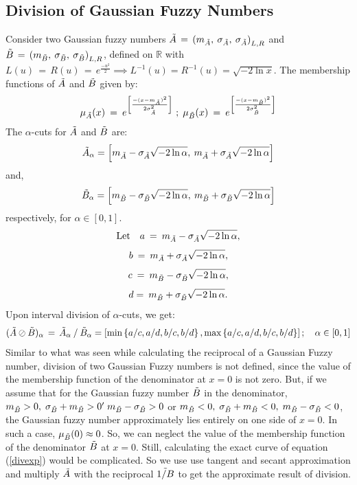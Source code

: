 \documentclass{article}
\begin{document}
\subsection{Division of Gaussian Fuzzy Numbers}
Consider two Gaussian fuzzy numbers $\Tilde{A} \,=\, \left(m_{\Tilde{A}},\: \sigma_{\Tilde{A}}, \:\sigma_{\Tilde{A}}\right)_{L,R}$ and $\Tilde{B}\,=\, \left(m_{\Tilde{B}},\: \sigma_{\Tilde{B}}, \:\sigma_{\Tilde{B}}\right)_{L,R}$, defined on $\mathbb{R}$ with $L(u) \,=\, R(u)\,=\,e^{\frac{-u^2}{2}}\implies L^{-1}(u) = R^{-1} (u) = \sqrt{-2\ln{x}}$. The membership functions of $\Tilde{A}$ and $\Tilde{B}$ given by:
\[ \mu_{\Tilde{A}}(x) \:=\:e^{\left[ \frac{-(x-m_{\Tilde{A}})^2}{2\sigma_{\Tilde{A}}^{2}} \right]}\;  ; \;\mu_{\Tilde{B}}(x) \: = \:e^{\left[ \frac{-(x-m_{\Tilde{B}})^2}{2\sigma_{\Tilde{B}}^{2}} \right]} \]
The $\alpha$-cuts for $\Tilde{A}$ and $\Tilde{B}$ are: \[ \Tilde{A}_{\alpha} = \left[m_{\Tilde{A}}-\sigma_{\Tilde{A}}\sqrt{-2\ln{\alpha}}, \: m_{\Tilde{A}}+\sigma_{\Tilde{A}}\sqrt{-2\ln{\alpha}} \right]\] and, \[ \Tilde{B}_{\alpha} = \left[m_{\Tilde{B}}-\sigma_{\Tilde{B}}\sqrt{-2\ln{\alpha}}, \: m_{\Tilde{B}}+\sigma_{\Tilde{B}}\sqrt{-2\ln{\alpha}} \right]\] respectively, for $\alpha\in[0,1]$.
\[
\text{Let}\quad a\: = \:m_{\Tilde{A}}-\sigma_{\Tilde{A}}\sqrt{-2\ln{\alpha}},\] 
\[b \: =  \: m_{\Tilde{A}}+\sigma_{\Tilde{A}}\sqrt{-2\ln{\alpha}},\]
\[c \: =\: m_{\Tilde{B}}-\sigma_{\Tilde{B}}\sqrt{-2\ln{\alpha}}, \]
\[d = \:  m_{\Tilde{B}}+\sigma_{\Tilde{B}}\sqrt{-2\ln{\alpha}}.
\]\newline Upon interval division of $\alpha$-cuts, we get:
\begin{equation}\label{divexp}
 (\Tilde{A}\oslash\Tilde{B})_\alpha\,=\,\Tilde{A}_\alpha \: / \: \Tilde{B}_\alpha = \left[ \text{min}\left\{a/c, a/d, b/c, b/d \right\}, \text{max}\left\{a/c, a/d, b/c, b/d \right\} \right]; \quad\alpha\in [0,1]
\end{equation}\newline Similar to what was seen while calculating the reciprocal of a Gaussian Fuzzy number, division of two Gaussian Fuzzy numbers is not defined, since the value of the membership function of the denominator at $x=0$ is not zero. But, if we assume that for the Gaussian fuzzy number $\Tilde{B}$ in the denominator,  $m_{\Tilde{B}}>0,\; \sigma_{\Tilde{B}} + m_{\Tilde{B}}>0 '\; m_{\Tilde{B}}-\sigma_{\Tilde{B}}>0$ or $m_{\Tilde{B}}<0,\; \sigma_{\Tilde{B}} + m_{\Tilde{B}} <0,\; m_{\Tilde{B}}-\sigma_{\Tilde{B}} <0$, the Gaussian fuzzy number approximately lies entirely on one side of $x = 0$. In such a case, $\mu_{\Tilde{B}}(0)\approx0$. So, we can neglect the value of the membership function of the denominator $\Tilde{B}$ at $x = 0$. Still, calculating the exact curve of equation (\ref{divexp}) would be complicated. So we use use tangent and secant approximation and multiply $\Tilde{A}$ with the reciprocal $\Tilde{1/B}$ to get the approximate result of division.
\end{document}
